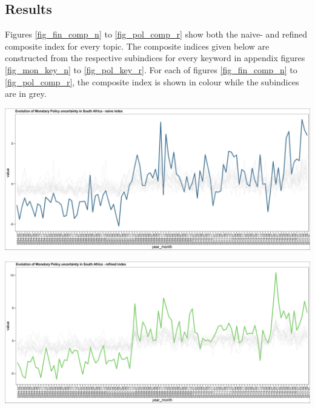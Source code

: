\documentclass[11pt,preprint, authoryear]{elsarticle}
\let\origfigure\figure
\let\endorigfigure\endfigure
\renewenvironment{figure}[1][2] {
    \expandafter\origfigure\expandafter[H]
} {
    \endorigfigure
}
\numberwithin{equation}{section}
\numberwithin{figure}{section}
\numberwithin{table}{section}
\begin{document}
\subsection{\texorpdfstring{Results
\label{sec_results}}{Results }}\label{results}
Figures \ref{fig_fin_comp_n} to \ref{fig_pol_comp_r} show both the naive- and refined composite index for every topic. The composite indices given below are constructed from the respective subindices for every keyword in appendix figures \ref{fig_mon_key_n} to \ref{fig_pol_key_r}. For each of figures \ref{fig_fin_comp_n} to \ref{fig_pol_comp_r}, the composite index is shown in colour while the subindices are in grey. 

\begin{figure}
	\centering
	\includegraphics[width=\linewidth, keepaspectratio]{bin/monetary_comp_naive}\\
	\caption{Composite Monetary Policy uncertainty naive index. \label{fig_mon_comp_n}}
\end{figure}

\begin{figure}
	\centering
	\includegraphics[width=\linewidth, keepaspectratio]{bin/monetary_comp_refine}\\
	\caption{Composite Monetary Policy uncertainty refined index. \label{fig_mon_comp_r}}
\end{figure}
\end{document}
